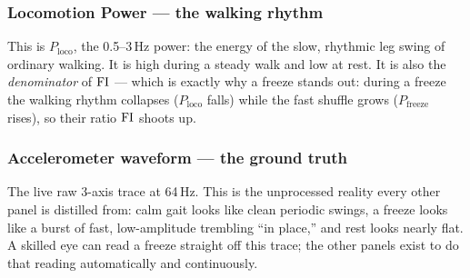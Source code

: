 \subsubsection*{Locomotion Power --- the walking rhythm}

This is $P_{\text{loco}}$, the 0.5--3\,Hz power: the energy of the slow, rhythmic leg
swing of ordinary walking. It is high during a steady walk and low at rest. It is also
the \emph{denominator} of $\mathrm{FI}$ --- which is exactly why a freeze stands out: during a
freeze the walking rhythm collapses ($P_{\text{loco}}$ falls) while the fast shuffle
grows ($P_{\text{freeze}}$ rises), so their ratio $\mathrm{FI}$ shoots up.

\subsubsection*{Accelerometer waveform --- the ground truth}

The live raw 3-axis trace at 64\,Hz. This is the unprocessed reality every other panel is
distilled from: calm gait looks like clean periodic swings, a freeze looks like a burst
of fast, low-amplitude trembling ``in place,'' and rest looks nearly flat. A skilled eye
can read a freeze straight off this trace; the other panels exist to do that reading
automatically and continuously.

